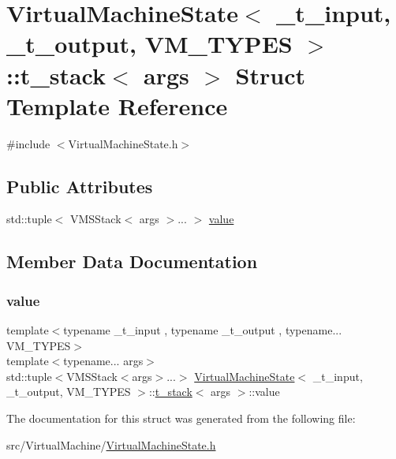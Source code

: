 \hypertarget{struct_virtual_machine_state_1_1t__stack}{}\section{Virtual\+Machine\+State$<$ \+\_\+t\+\_\+input, \+\_\+t\+\_\+output, V\+M\+\_\+\+T\+Y\+P\+ES $>$\+:\+:t\+\_\+stack$<$ args $>$ Struct Template Reference}
\label{struct_virtual_machine_state_1_1t__stack}


{\ttfamily \#include $<$Virtual\+Machine\+State.\+h$>$}

\subsection*{Public Attributes}
\begin{DoxyCompactItemize}
\item 
std\+::tuple$<$ V\+M\+S\+Stack$<$ args $>$... $>$ \hyperlink{struct_virtual_machine_state_1_1t__stack_afe95593f469950dcc3bd2332f21fbf12}{value}
\end{DoxyCompactItemize}


\subsection{Member Data Documentation}
\mbox{\label{struct_virtual_machine_state_1_1t__stack_afe95593f469950dcc3bd2332f21fbf12}} 
\subsubsection{\texorpdfstring{value}{value}}
{\footnotesize\ttfamily template$<$typename \+\_\+t\+\_\+input , typename \+\_\+t\+\_\+output , typename... V\+M\+\_\+\+T\+Y\+P\+ES$>$ \\
template$<$typename... args$>$ \\
std\+::tuple$<$V\+M\+S\+Stack$<$args$>$...$>$ \hyperlink{class_virtual_machine_state}{Virtual\+Machine\+State}$<$ \+\_\+t\+\_\+input, \+\_\+t\+\_\+output, V\+M\+\_\+\+T\+Y\+P\+ES $>$\+::\hyperlink{struct_virtual_machine_state_1_1t__stack}{t\+\_\+stack}$<$ args $>$\+::value}



The documentation for this struct was generated from the following file\+:\begin{DoxyCompactItemize}
\item 
src/\+Virtual\+Machine/\hyperlink{_virtual_machine_state_8h}{Virtual\+Machine\+State.\+h}\end{DoxyCompactItemize}
